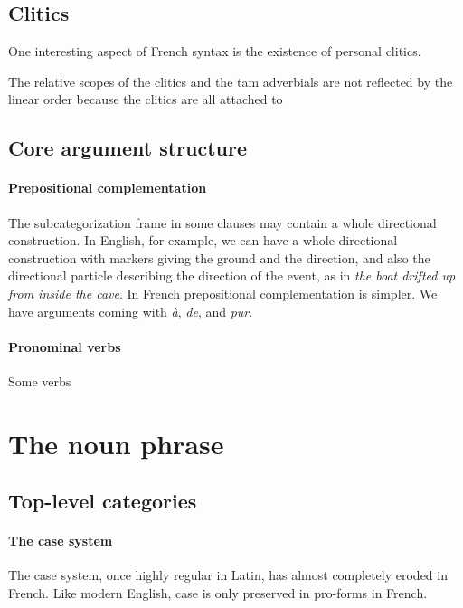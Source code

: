 \documentclass[a4paper, oneside, 12pt]{report}
\newcommand{\form}[1]{\emph{#1}}
\begin{document}
\subsection{Clitics}\label{sec:grammatical.clause.clitic}

One interesting aspect of French syntax is the existence of personal clitics.

The relative scopes of the clitics and the \ac{tam} adverbials are not reflected by the linear order because the clitics are all attached to 

\subsection{Core argument structure}

\paragraph*{Prepositional complementation} 
The subcategorization frame in some clauses may contain a whole directional construction.
In English, for example, we can have a whole directional construction
with markers giving the ground and the direction,
and also the directional particle describing the direction of the event,
as in \form{the boat drifted up from inside the cave}.
In French prepositional complementation is simpler.
We have arguments coming with \form{à}, \form{de}, and \form{pur}.

\paragraph*{Pronominal verbs}
Some verbs 

\section{The noun phrase}

\subsection{Top-level categories}

\paragraph*{The case system}\label{sec:grammatical.np.peripheral.case}
The case system, once highly regular in Latin, has almost completely eroded in French.
Like modern English, case is only preserved in pro-forms in French.
\end{document}
